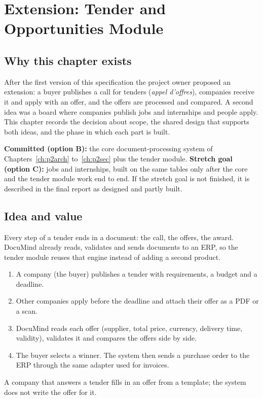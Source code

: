 \chapter{Extension: Tender and Opportunities Module}\label{ch:p2tender}
\section{Why this chapter exists}
After the first version of this specification the project owner proposed an extension: a buyer publishes a call for tenders (\emph{appel d'offres}), companies receive it and apply with an offer, and the offers are processed and compared. A second idea was a board where companies publish jobs and internships and people apply. This chapter records the decision about scope, the shared design that supports both ideas, and the phase in which each part is built.

\begin{infobox}
\textbf{Committed (option B):} the core document-processing system of Chapters~\ref{ch:p2arch} to~\ref{ch:p2sec} plus the tender module. \textbf{Stretch goal (option C):} jobs and internships, built on the same tables only after the core and the tender module work end to end. If the stretch goal is not finished, it is described in the final report as designed and partly built.
\end{infobox}

\section{Idea and value}
Every step of a tender ends in a document: the call, the offers, the award. DocuMind already reads, validates and sends documents to an ERP, so the tender module reuses that engine instead of adding a second product.
\begin{enumerate}
\item A company (the buyer) publishes a tender with requirements, a budget and a deadline.
\item Other companies apply before the deadline and attach their offer as a PDF or a scan.
\item DocuMind reads each offer (supplier, total price, currency, delivery time, validity), validates it and compares the offers side by side.
\item The buyer selects a winner. The system then sends a purchase order to the ERP through the same adapter used for invoices.
\end{enumerate}
A company that answers a tender fills in an offer from a template; the system does not write the offer for it.


